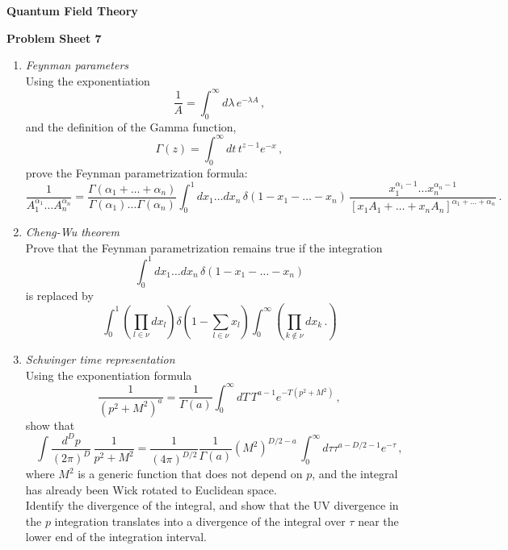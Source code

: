 \documentclass[12pt,a4paper]{article}
\begin{document}
\begin{center}
{\bf Quantum Field Theory}\\[\baselineskip]
\end{center}
{\bf Problem Sheet 7}

\begin{enumerate}
\item {\it Feynman parameters} \\

  Using the exponentiation
  \[
    \frac{1}{A} = \int_0^\infty d\lambda\, e^{-\lambda A}\, ,
  \]
  and the definition of the Gamma function,
  \[
    \Gamma(z) = \int_0^\infty dt\, t^{z-1} e^{-x}\, ,
  \]
  prove the Feynman parametrization formula:
  \[
    \frac{1}{A_1^{\alpha_1} \ldots A_n^{\alpha_n}} =
    \frac{\Gamma(\alpha_1+\ldots+\alpha_n)}{\Gamma(\alpha_1) \ldots
      \Gamma(\alpha_n)} \int_0^1dx_1 \ldots dx_n\,
    \delta(1-x_1-\ldots -x_n)\,
    \frac{x_1^{\alpha_1-1} \ldots x_n^{\alpha_n-1}}{\left[x_1 A_1 +
        \ldots + x_n A_n\right]^{\alpha_1+\ldots +\alpha_n}}\, .
  \]

  \bigskip
  
\item {\it Cheng-Wu theorem}\\

  Prove that the Feynman parametrization remains true if the
  integration
  \[
    \int_0^1dx_1 \ldots dx_n\,
    \delta(1-x_1-\ldots -x_n)
  \]
  is replaced by
  \[
    \int_0^1 \left(\prod_{l\in\nu} dx_l\right)
    \delta\left(1-\sum_{l\in\nu}x_l\right)
    \int_0^\infty \left(
      \prod_{k\not\in\nu}dx_k\, .
    \right)
  \]

  \bigskip

\item {\it Schwinger time representation}\\

  Using the exponentiation formula
  \[
    \frac{1}{(p^2+M^2)^a} = \frac{1}{\Gamma(a)} \int_0^\infty dT\,
    T^{a-1} e^{-T (p^2+M^2)}\, ,
  \]
  show that
  \[
    \int \frac{d^Dp}{(2\pi)^D}\, \frac{1}{p^2+M^2} =
    \frac{1}{(4\pi)^{D/2}}  \frac{1}{\Gamma(a)} \left(M^2\right)^{D/2-a}\, \int_0^\infty
    d\tau \tau^{a-D/2-1} e^{-\tau}\, ,
  \]
  where $M^2$ is a generic function that does not depend on $p$, and
  the integral has already been Wick rotated to Euclidean space. \\

  Identify the divergence of the integral, and show that the UV
  divergence in the $p$ integration translates into a divergence of
  the integral over $\tau$ near the lower end of the integration
  interval. \\


\end{enumerate}
\end{document}
